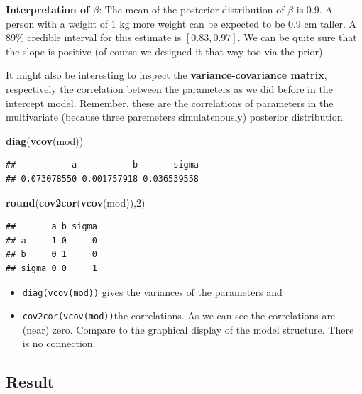 \documentclass[
]{book}
\newenvironment{Shaded}{\begin{snugshade}}{\end{snugshade}}
\newcommand{\DecValTok}[1]{\textcolor[rgb]{0.00,0.00,0.81}{#1}}
\newcommand{\FunctionTok}[1]{\textcolor[rgb]{0.13,0.29,0.53}{\textbf{#1}}}
\newcommand{\NormalTok}[1]{#1}
\providecommand{\tightlist}{%
  \setlength{\itemsep}{0pt}\setlength{\parskip}{0pt}}
\begin{document}
\textbf{Interpretation of \(\beta\)}:
The mean of the posterior distribution of \(\beta\) is 0.9. A person with a weight
of 1 kg more weight can be expected to be 0.9 cm taller. A 89\% credible interval
for this estimate is \([0.83, 0.97]\). We can be quite sure that the slope is
positive (of course we designed it that way too via the prior).

It might also be interesting to inspect the \textbf{variance-covariance matrix},
respectively the correlation between the parameters as we did before
in the intercept model. Remember, these are the correlations of
parameters in the multivariate (because three paremeters simulatenously)
posterior distribution.

\begin{Shaded}
\begin{Highlighting}[]
\FunctionTok{diag}\NormalTok{(}\FunctionTok{vcov}\NormalTok{(mod))}
\end{Highlighting}
\end{Shaded}

\begin{verbatim}
##           a           b       sigma 
## 0.073078550 0.001757918 0.036539558
\end{verbatim}

\begin{Shaded}
\begin{Highlighting}[]
\FunctionTok{round}\NormalTok{(}\FunctionTok{cov2cor}\NormalTok{(}\FunctionTok{vcov}\NormalTok{(mod)),}\DecValTok{2}\NormalTok{)}
\end{Highlighting}
\end{Shaded}

\begin{verbatim}
##       a b sigma
## a     1 0     0
## b     0 1     0
## sigma 0 0     1
\end{verbatim}

\begin{itemize}
\tightlist
\item
  \texttt{diag(vcov(mod))} gives the variances of the parameters and
\item
  \texttt{cov2cor(vcov(mod))}the correlations. As we can see the correlations are (near) zero. Compare to the graphical
  display of the model structure. There is no connection.
\end{itemize}

\subsection{Result}\label{result}
\end{document}
